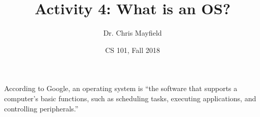 \documentclass[12pt]{article}
\title{Activity 4: What is an OS?}
\author{Dr. Chris Mayfield}
\date{CS 101, Fall 2018}
\begin{document}
\maketitle

According to Google, an operating system is ``the software that supports a computer's basic functions, such as scheduling tasks, executing applications, and controlling peripherals.''



\end{document}
